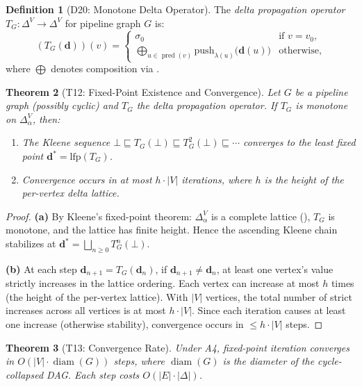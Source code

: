 \documentclass[11pt,a4paper]{article}
\newtheorem{theorem}{Theorem}[section]
\theoremstyle{definition}
\newtheorem{definition}[theorem]{Definition}
\newcommand{\push}{\mathrm{push}}
\DeclareMathOperator{\pred}{pred}
\DeclareMathOperator{\diam}{diam}
\begin{document}
\begin{definition}[D20: Monotone Delta Operator]\label{def:monotone-operator}
The \emph{delta propagation operator} $T_G \colon \Delta^V \to \Delta^V$
for pipeline graph $G$ is:
\[
  (T_G(\mathbf{d}))(v) =
  \begin{cases}
    \sigma_0 & \text{if } v = v_0, \\[3pt]
    \displaystyle\bigoplus_{u \in \pred(v)}
      \push_{\lambda(u)}\!\bigl(\mathbf{d}(u)\bigr) & \text{otherwise},
  \end{cases}
\]
where $\bigoplus$ denotes composition via .
\end{definition}

\begin{theorem}[T12: Fixed-Point Existence and Convergence]\label{thm:fixedpoint}
Let $G$ be a pipeline graph (possibly cyclic) and $T_G$ the delta propagation
operator.  If $T_G$ is monotone on $\Delta^V_\alpha$, then:
\begin{enumerate}[label=(\alph*)]
  \item The Kleene sequence $\bot \sqsubseteq T_G(\bot) \sqsubseteq T_G^2(\bot)
    \sqsubseteq \cdots$ converges to the least fixed point
    $\mathbf{d}^* = \mathrm{lfp}(T_G)$.
  \item Convergence occurs in at most $h \cdot |V|$ iterations, where $h$ is
    the height of the per-vertex delta lattice.
\end{enumerate}
\end{theorem}

\begin{proof}
\textbf{(a)} By Kleene's fixed-point theorem: $\Delta^V_\alpha$ is a complete
lattice (), $T_G$ is monotone, and the lattice has
finite height.  Hence the ascending Kleene chain stabilizes at
$\mathbf{d}^* = \bigsqcup_{n \geq 0} T_G^n(\bot)$.

\textbf{(b)} At each step $\mathbf{d}_{n+1} = T_G(\mathbf{d}_n)$, if
$\mathbf{d}_{n+1} \neq \mathbf{d}_n$, at least one vertex's value strictly
increases in the lattice ordering.  Each vertex can increase at most $h$ times
(the height of the per-vertex lattice).  With $|V|$ vertices, the total
number of strict increases across all vertices is at most $h \cdot |V|$.
Since each iteration causes at least one increase (otherwise stability),
convergence occurs in $\leq h \cdot |V|$ steps.
\end{proof}

\begin{theorem}[T13: Convergence Rate]\label{thm:convergence-rate}
Under A4, fixed-point iteration converges in $O(|V| \cdot \diam(G))$ steps,
where $\diam(G)$ is the diameter of the cycle-collapsed DAG.  Each step costs
$O(|E| \cdot |\Delta|)$.
\end{theorem}
\end{document}
